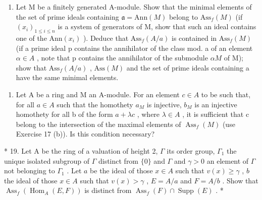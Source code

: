 \begin{enumerate}
\def\labelenumi{(\alph{enumi})}
\setcounter{enumi}{9}
\tightlist
\item
  Let M be a finitely generated A-module. Show that the minimal elements of the set of prime ideals containing \(\mathfrak{a} = \text{Ann}(M)\) belong to \(\text{Ass}_{f}(M)\) (if \((x_{i})_{1 \leq i \leq n}\) is a system of generators of M, show that such an ideal contains one of the \(\text{Ann}(x_{i})\) ). Deduce that \(\text{Ass}_{f}(A/a)\) is contained in \(\text{Ass}_{f}(M)\) (if a prime ideal p contains the annihilator of the class mod. a of an element \(\alpha \in A\) , note that p contains the annihilator of the submodule \(\alpha M\) of M); show that \(\text{Ass}_{f}(A/a)\) , \(\text{Ass}(M)\) and the set of prime ideals containing a have the same minimal elements.
\end{enumerate}

\begin{enumerate}
\def\labelenumi{\arabic{enumi}.}
\setcounter{enumi}{17}
\tightlist
\item
  Let A be a ring and M an A-module. For an element \(c \in A\) to be such that, for all \(a \in A\) such that the homothety \(a_{M}\) is injective, \(b_{M}\) is an injective homothety for all b of the form \(a + \lambda c\) , where \(\lambda \in A\) , it is sufficient that c belong to the intersection of the maximal elements of \(\operatorname{Ass}_{f}(M)\) (use Exercise 17 (b)). Is this condition necessary?
\end{enumerate}

* 19. Let A be the ring of a valuation of height 2, \(\Gamma\) its order group, \(\Gamma_1\) the unique isolated subgroup of \(\Gamma\) distinct from \(\{0\}\) and \(\Gamma\) and \(\gamma > 0\) an element of \(\Gamma\) not belonging to \(\Gamma_1\) . Let \(a\) be the ideal of those \(x \in A\) such that \(v(x) \geqslant \gamma\) , \(b\) the ideal of those \(x \in A\) such that \(v(x) > \gamma\) , \(E = A/a\) and \(F = A/b\) . Show that \(\operatorname{Ass}_f(\operatorname{Hom}_A(E, F))\) is distinct from \(\operatorname{Ass}_f(F) \cap \operatorname{Supp}(E)\) . *

